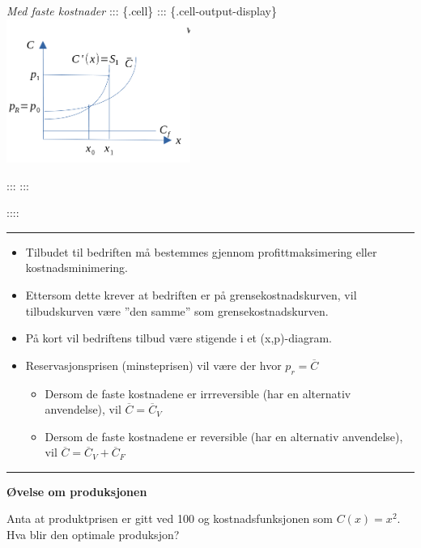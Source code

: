 \documentclass[
  letterpaper,
  DIV=11,
  numbers=noendperiod]{scrartcl}
\providecommand{\tightlist}{%
  \setlength{\itemsep}{0pt}\setlength{\parskip}{0pt}}\usepackage{longtable,booktabs,array}
\begin{document}
\emph{Med faste kostnader} ::: \{.cell\} ::: \{.cell-output-display\}
\includegraphics[width=0.45\textwidth,height=\textheight]{drawio/kgkmfast.png}

::: :::

::::

\begin{center}\rule{0.5\linewidth}{0.5pt}\end{center}

\begin{itemize}
\tightlist
\item
  Tilbudet til bedriften må bestemmes gjennom profittmaksimering eller
  kostnadsminimering.\\
\item
  Ettersom dette krever at bedriften er på grensekostnadskurven, vil
  tilbudskurven være ''den samme'' som grensekostnadskurven.
\item
  På kort vil bedriftens tilbud være stigende i et (x,p)-diagram.
\item
  Reservasjonsprisen (minsteprisen) vil være der hvor
  \(p_r=\overline{C}\)

  \begin{itemize}
  \tightlist
  \item
    Dersom de faste kostnadene er irrreversible (har en alternativ
    anvendelse), vil \(\overline{C}=\overline{C}_V\)
  \item
    Dersom de faste kostnadene er reversible (har en alternativ
    anvendelse), vil \(\overline{C}=\overline{C}_V+\overline{C}_F\)
  \end{itemize}
\end{itemize}

\begin{center}\rule{0.5\linewidth}{0.5pt}\end{center}

\textbf{Øvelse om produksjonen}

Anta at produktprisen er gitt ved 100 og kostnadsfunksjonen som
\(C(x)=x^2\). Hva blir den optimale produksjon?
\end{document}
